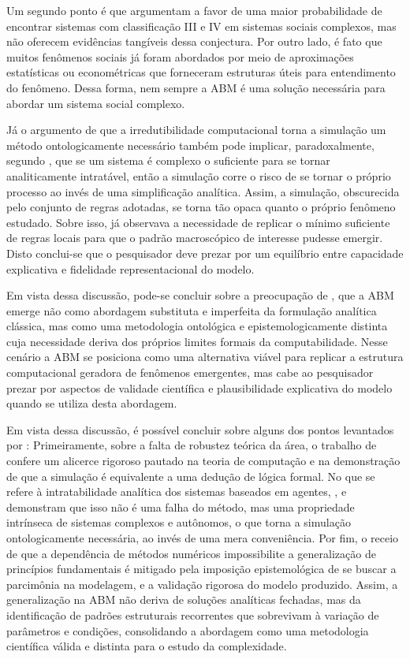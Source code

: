 \documentclass[12pt,oneside,a4paper,brazil,sumario=tradicional]{abntex2}
\begin{document}
Um segundo ponto é que  argumentam a favor de uma maior probabilidade de encontrar sistemas com classificação III e IV em sistemas sociais complexos, mas não oferecem evidências tangíveis dessa conjectura. Por outro lado, é fato que muitos fenômenos sociais já foram abordados por meio de aproximações estatísticas ou econométricas que forneceram estruturas úteis para entendimento do fenômeno. Dessa forma, nem sempre a ABM é uma solução necessária para abordar um sistema social complexo.

Já o argumento de que a irredutibilidade computacional torna a simulação um método ontologicamente necessário também pode implicar, paradoxalmente, segundo , que se um sistema é complexo o suficiente para se tornar analiticamente intratável, então a simulação corre o risco de se tornar o próprio processo ao invés de uma simplificação analítica. Assim, a simulação, obscurecida pelo conjunto de regras adotadas, se torna tão opaca quanto o próprio fenômeno estudado. Sobre isso,  já observava a necessidade de replicar o mínimo suficiente de regras locais para que o padrão macroscópico de interesse pudesse emergir. Disto conclui-se que o pesquisador deve prezar por um equilíbrio entre capacidade explicativa e fidelidade representacional do modelo.

Em vista dessa discussão, pode-se concluir sobre a preocupação de , que a ABM emerge não como abordagem substituta e imperfeita da formulação analítica clássica, mas como uma metodologia ontológica e epistemologicamente distinta cuja necessidade deriva dos próprios limites formais da computabilidade. Nesse cenário a ABM se posiciona como uma alternativa viável para replicar a estrutura computacional geradora de fenômenos emergentes, mas cabe ao pesquisador prezar por aspectos de validade científica e plausibilidade explicativa do modelo quando se utiliza desta abordagem.

Em vista dessa discussão, é possível concluir sobre alguns dos pontos levantados por : Primeiramente, sobre a falta de robustez teórica da área, o trabalho de  confere um alicerce rigoroso pautado na teoria de computação e na demonstração de que a simulação é equivalente a uma dedução de lógica formal. No que se refere à intratabilidade analítica dos sistemas baseados em agentes, ,  e  demonstram que isso não é uma falha do método, mas uma propriedade intrínseca de sistemas complexos e autônomos, o que torna a simulação ontologicamente necessária, ao invés de uma mera conveniência.  Por fim, o receio de que a dependência de métodos numéricos impossibilite a generalização de princípios fundamentais é mitigado pela imposição epistemológica de se buscar a parcimônia na modelagem, e a validação rigorosa do modelo produzido. Assim, a generalização na ABM não deriva de soluções analíticas fechadas, mas da identificação de padrões estruturais recorrentes que sobrevivam à variação de parâmetros e condições, consolidando a abordagem como uma metodologia científica válida e distinta para o estudo da complexidade.
\end{document}
